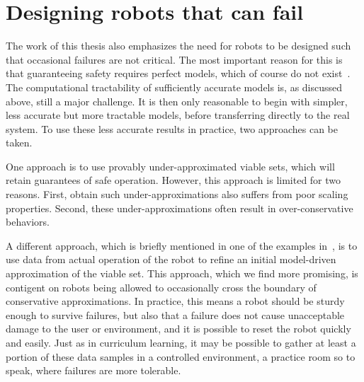 

\section{Designing robots that can fail}
The work of this thesis also emphasizes the need for robots to be designed such that occasional failures are not critical. The most important reason for this is that guaranteeing safety requires perfect models, which of course do not exist~\cite{box1976science}. The computational tractability of sufficiently accurate models is, as discussed above, still a major challenge. It is then only reasonable to begin with simpler, less accurate but more tractable models, before transferring directly to the real system. To use these less accurate results in practice, two approaches can be taken. \par
One approach is to use provably under-approximated viable sets, which will retain guarantees of safe operation. However, this approach is limited for two reasons. First, obtain such under-approximations also suffers from poor scaling properties. Second, these under-approximations often result in over-conservative behaviors. \par
A different approach, which is briefly mentioned in one of the examples in~\cite{heim2019learnable}, is to use data from actual operation of the robot to refine an initial model-driven approximation of the viable set. This approach, which we find more promising, is contigent on robots being allowed to occasionally cross the boundary of conservative approximations. In practice, this means a robot should be sturdy enough to survive failures, but also that a failure does not cause unacceptable damage to the user or environment, and it is possible to reset the robot quickly and easily. Just as in curriculum learning, it may be possible to gather at least a portion of these data samples in a controlled environment, a practice room so to speak, where failures are more tolerable. \par

